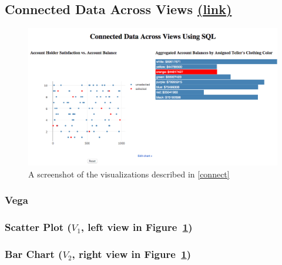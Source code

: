 \subsection{Connected Data Across Views \href{http://randy.cs.columbia.edu/lineage/pgbench-connect/pgbench.html}{(\underline{link})}}\label{connect}
\begin{figure}[H]
	\includegraphics[width=\columnwidth]{figures/connect}
	\caption{A screenshot of the visualizations described in \autoref{connect}
	}
	\label{fig_connect}
\end{figure}
\subsubsection{Vega}
\subsubsection*{Scatter Plot ($V_1$, left view in Figure~\ref{fig_connect})}

\subsubsection*{Bar Chart ($V_2$, right view in Figure~\ref{fig_connect})}

